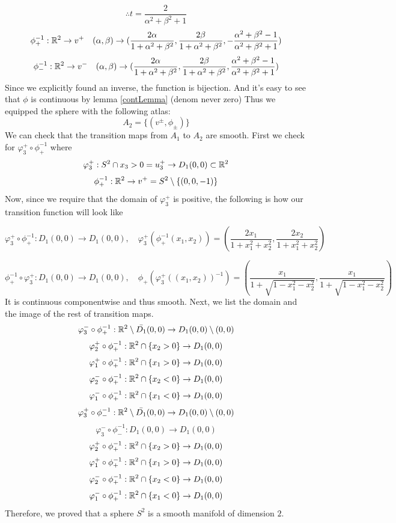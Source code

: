 \documentclass[11pt,a4paper]{report}
\begin{document}
$$ \therefore t = \frac{2}{\alpha^2 + \beta^2 +1 } $$
$$ \phi_{+}^{-1}:
\mathbb{R}^2 \to v^{+} 
\quad (\alpha, \beta)  \to
( \frac{2 \alpha}{1+\alpha^2+\beta^2},
  \frac{2 \beta}{1+\alpha^2+\beta^2},
  - \frac{\alpha^2+\beta^2-1}{\alpha^2+\beta^2+1})
$$
$$ \phi_{-}^{-1}:
\mathbb{R}^2 \to v^{-}
\quad (\alpha,\beta) \to
( \frac{2\alpha}{1+\alpha^2+\beta^2}, 
\frac{2\beta}{1+\alpha^2+\beta^2}, 
 \frac{\alpha^2 + \beta^2 -1}{\alpha^2+\beta^2+1} )
$$
Since we explicitly found an inverse, the function is bijection.
\newline
And it's easy to see that $\phi$ is continuous by lemma \ref{contLemma} (denom never zero)
Thus we equipped the sphere with the following atlas:
$$ A_2 = \{(v^{\pm},\phi_{\pm}) \} $$
We can check that the transition maps from $A_1$ to $A_2$ are smooth. \newline
First we check for $\varphi_3^{+} \circ \phi_{+}^{-1}$ where
$$ \varphi_3^{+}: S^2 \cap {x_3 > 0} = u_3^{+} \to D_1(0,0) \subset \mathbb{R}^2 $$
$$ \phi_{+}^{-1}: \mathbb{R}^2 \to v^{+} = S^2 \setminus \{ (0,0,-1) \} $$
Now, since we require that the domain of $\varphi_3^{+}$ is positive, the following is how our transition function will look like

$$\varphi_3^{+} \circ \phi_{+}^{-1}: D_1 (0,0) \to D_1(0,0), \quad \varphi_3^{+}( \phi_{+}^{-1}(x_1,x_2)) = (\frac{2x_1}{1+x_1^2+x_2^2}, \frac{2x_2}{1+x_1^2+x_2^2})$$

$$ \phi_{+}^{-1} \circ \varphi_3^{+}: D_1 (0,0) \to D_1(0,0), \quad  \phi_{+}(\varphi_3^{+}((x_1,x_2) )^{-1}) = (\frac{x_1}{1+\sqrt{1-x_1^2-x_2^2}}, \frac{x_1}{1+\sqrt{1-x_1^2-x_2^2}})$$
It is continuous componentwise and thus smooth.
Next, we list the domain and the image of the rest of transition maps.
$$\varphi_3^{-} \circ \phi_{+}^{-1}: \mathbb{R}^2 \setminus \bar{D_1} (0,0) \to D_1(0,0) \setminus (0,0)$$
$$\varphi_2^{+} \circ \phi_{+}^{-1}: \mathbb{R}^2 \cap \{ x_2 > 0 \} \to D_1 (0,0)$$
$$\varphi_1^{+} \circ \phi_{+}^{-1}: \mathbb{R}^2 \cap \{ x_1 > 0 \} \to D_1 (0,0)$$
$$\varphi_2^{-} \circ \phi_{+}^{-1}: \mathbb{R}^2 \cap \{ x_2 < 0 \} \to D_1 (0,0)$$
$$\varphi_1^{-} \circ \phi_{+}^{-1}: \mathbb{R}^2 \cap \{ x_1 < 0 \} \to D_1 (0,0)$$
$$\varphi_3^{+} \circ \phi_{-}^{-1}: \mathbb{R}^2 \setminus \bar{D_1} (0,0) \to D_1(0,0) \setminus (0,0)$$
$$\varphi_3^{-} \circ \phi_{-}^{-1}: D_1 (0,0) \to D_1(0,0) $$
$$\varphi_2^{+} \circ \phi_{+}^{-1}: \mathbb{R}^2 \cap \{ x_2 > 0 \} \to D_1 (0,0)$$
$$\varphi_1^{+} \circ \phi_{+}^{-1}: \mathbb{R}^2 \cap \{ x_1 > 0 \} \to D_1 (0,0)$$
$$\varphi_2^{-} \circ \phi_{+}^{-1}: \mathbb{R}^2 \cap \{ x_2 < 0 \} \to D_1 (0,0)$$
$$\varphi_1^{-} \circ \phi_{+}^{-1}: \mathbb{R}^2 \cap \{ x_1 < 0 \} \to D_1 (0,0)$$
Therefore, we proved that a sphere $S^2$ is a smooth manifold of dimension $2$.
\end{document}
